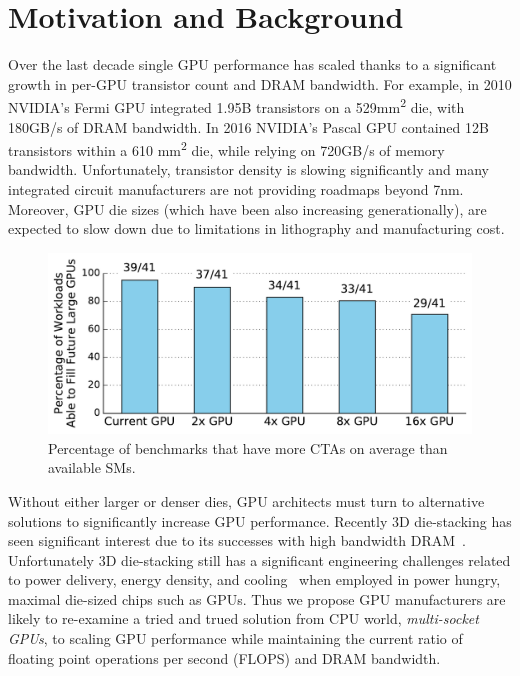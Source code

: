 \section{Motivation and Background}
\label{sec:background}

Over the last decade single GPU performance has scaled thanks to a 
significant growth in per-GPU transistor count and DRAM bandwidth. For example, 
in 2010 NVIDIA's Fermi GPU integrated 1.95B transistors on a 
529mm\textsuperscript{2} die, with 180GB/s of DRAM bandwidth.  In 2016 NVIDIA's 
Pascal GPU contained 12B transistors within a 610 mm\textsuperscript{2} die, while 
relying on 720GB/s of memory bandwidth. Unfortunately, transistor density is 
slowing significantly and many integrated circuit manufacturers are not providing roadmaps beyond 7nm. 
Moreover, GPU die sizes (which have been also increasing generationally), are 
expected to slow down due to limitations in lithography and manufacturing cost.

\begin{figure}[t] 
    \centering
    \includegraphics[width=1.0\columnwidth]{figures/plot_ctas_per_sm.pdf}
    \caption{Percentage of benchmarks that have more CTAs on average than 
available SMs.}
    \label{fig:ctas}
    \vspace{-.2in}
\end{figure}

Without either larger or denser dies, GPU architects must turn to 
alternative solutions to significantly increase GPU performance.  Recently 3D 
die-stacking has seen significant interest due to its successes with high 
bandwidth DRAM~\cite{HBM}. Unfortunately 3D die-stacking still has 
a significant engineering challenges related to power delivery, 
energy density, and cooling~\cite{verbree2010cost} when employed in power 
hungry, maximal die-sized chips such as GPUs. Thus we propose GPU manufacturers 
are likely to re-examine a tried and trued solution from CPU world, 
\textit{multi-socket GPUs}, to scaling GPU performance while maintaining the 
current ratio of floating point operations per second (FLOPS) and DRAM 
bandwidth.

